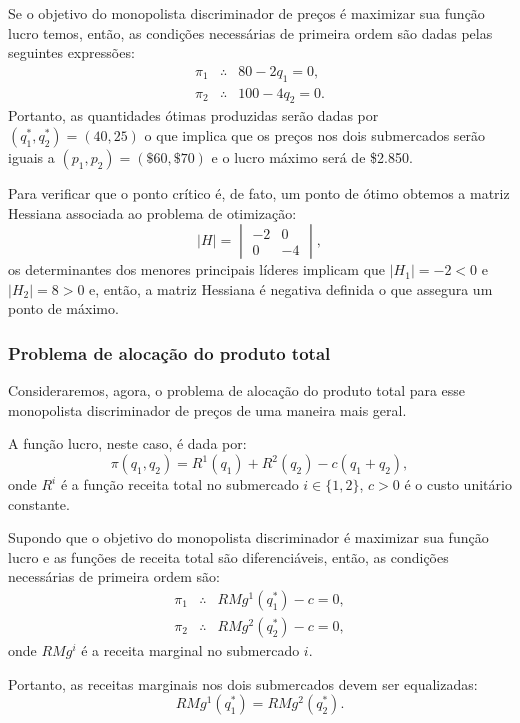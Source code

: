 \documentclass[preprintnumbers,nofootinbib,amsmath,amssymb,12pt]{article}
\begin{document}
Se o objetivo do monopolista discriminador de preços é maximizar sua função lucro temos, então, as condições necessárias de primeira ordem são dadas pelas seguintes expressões:
\begin{eqnarray*}
\pi_1 &\therefore& 80 - 2q_1 = 0, \\
\pi_2&\therefore& 100-4q_2 = 0.
\end{eqnarray*}
Portanto, as quantidades ótimas produzidas serão dadas por $(q_1^*, q_2^*) = (40, 25)$ o que implica que os preços nos dois submercados serão iguais a $(p_1, p_2) = (\$60, \$70)$ e o lucro máximo será de \$2.850.

Para verificar que o ponto crítico é, de fato, um ponto de ótimo obtemos a matriz Hessiana associada ao problema de otimização:
\[
|H| = \begin{vmatrix}
-2 & 0 \\0 & -4
\end{vmatrix},
\]
os determinantes dos menores principais líderes implicam que $|H_1| = -2<0$ e $|H_2| = 8> 0$ e, então, a matriz Hessiana é negativa definida o que assegura um ponto de máximo.

\newpage
\subsubsection{Problema de alocação do produto total}

Consideraremos, agora, o problema de alocação do produto total para esse monopolista discriminador de preços de uma maneira mais geral.

A função lucro, neste caso, é dada por:
\begin{equation}
    \pi(q_1, q_2) = R^1(q_1) + R^2(q_2) - c(q_1 + q_2),
    \label{eq10}
\end{equation}
onde $R^i$ é a função receita total no submercado $i \in\{1,2\}$, $c > 0$ é o custo unitário constante.

Supondo que o objetivo do monopolista discriminador é maximizar sua função lucro e as funções de receita total são diferenciáveis, então, as condições necessárias de primeira ordem são:
\begin{eqnarray}
\pi_1 &\therefore& RMg^1(q_1^*) - c = 0, \label{eq11} \\
\pi_2 &\therefore& RMg^2(q_2^*) - c = 0, \label{eq12}
\end{eqnarray}
onde $RMg^i$ é a receita marginal no submercado $i$.

Portanto, as receitas marginais nos dois submercados devem ser equalizadas:
\begin{equation}
    RMg^1(q_1^*) = RMg^2(q_2^*). \label{eq13}
\end{equation}
\end{document}
